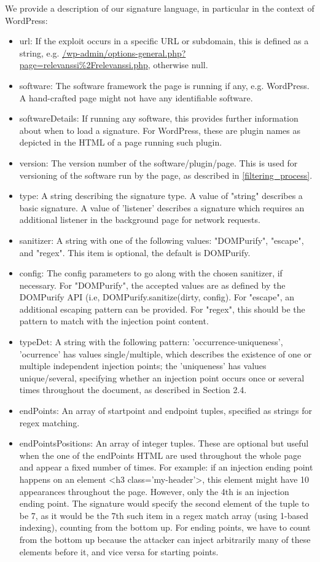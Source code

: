 We provide a description of our signature language, in particular in the context of WordPress:
\begin{itemize}
	\item
	url: If the exploit occurs in a specific URL or subdomain, this is defined as a string, e.g.
	\url{/wp-admin/options-general.php?page=relevanssi\%2Frelevanssi.php}, otherwise null.
	\item
	software: The software framework the page is running if any, e.g. WordPress. A hand-crafted page
	might not have any identifiable software.
	\item
	softwareDetails: If running any software, this provides further information about when to load a signature. For WordPress, these are plugin names as depicted in the HTML of a page running such plugin.
	\item
	version: The version number of the software/plugin/page. This is used for versioning of the software run by the page, as described in \autoref{filtering_process}.
	\item 
	type: A string describing the signature type. A value of "string" describes a basic signature. A value of 'listener' describes a signature which requires an additional listener in the background page for network requests.
	\item 
	sanitizer: A string with one of the following values: "DOMPurify", "escape", and "regex". This item is optional, the default is DOMPurify.
	\item
	config: The config parameters to go along with the chosen sanitizer, if necessary. For "DOMPurify", the accepted values are as defined by the DOMPurify API (i.e, DOMPurify.sanitize(dirty, config). For "escape", an additional escaping pattern can be provided. For "regex", this should be the pattern to match with the injection point content.
	\item
	typeDet: A string with the following pattern: 'occurrence-uniqueness', 'ocurrence' has values single/multiple, which describes the existence of one or multiple independent injection points; the 'uniqueness' has values unique/several, specifying whether an injection point occurs once or several times throughout the document, as described in Section 2.4.
	\item
	endPoints: An array of startpoint and endpoint tuples, specified as strings for regex matching.
	\item 
	endPointsPositions: An array of integer tuples. These are optional but useful when the one of the endPoints HTML are used throughout the whole page and appear a fixed number of times. For example: if an injection ending point happens on an element <h3 class='my-header'>, this element might have 10 appearances throughout the page. However, only the 4th is an injection ending point. The signature would specify the second element of the tuple to be 7, as it would be the 7th such item in a regex match array (using 1-based indexing), counting from the bottom up. For ending points, we have to count from the bottom up because the attacker can inject arbitrarily many of these elements before it, and vice versa for starting points.
\end{itemize}


